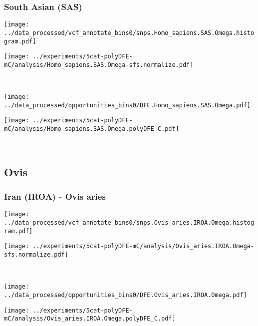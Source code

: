 \subsubsection{South Asian (SAS)}

\begin{minipage}{0.49\linewidth}
    \texttt{[image: ../data\_processed/vcf\_annotate\_bins0/snps.Homo\_sapiens.SAS.Omega.histogram.pdf]}
\end{minipage}
\begin{minipage}{0.49\linewidth}
    \texttt{[image: ../experiments/5cat-polyDFE-mC/analysis/Homo\_sapiens.SAS.Omega-sfs.normalize.pdf]}
\end{minipage}
\\
\begin{minipage}{0.49\linewidth}
    \texttt{[image: ../data\_processed/opportunities\_bins0/DFE.Homo\_sapiens.SAS.Omega.pdf]}
\end{minipage}
\begin{minipage}{0.49\linewidth}
    \texttt{[image: ../experiments/5cat-polyDFE-mC/analysis/Homo\_sapiens.SAS.Omega.polyDFE\_C.pdf]}
\end{minipage}
\\

\subsection{Ovis}

\subsubsection{Iran (IROA) - Ovis aries}

\begin{minipage}{0.49\linewidth}
    \texttt{[image: ../data\_processed/vcf\_annotate\_bins0/snps.Ovis\_aries.IROA.Omega.histogram.pdf]}
\end{minipage}
\begin{minipage}{0.49\linewidth}
    \texttt{[image: ../experiments/5cat-polyDFE-mC/analysis/Ovis\_aries.IROA.Omega-sfs.normalize.pdf]}
\end{minipage}
\\
\begin{minipage}{0.49\linewidth}
    \texttt{[image: ../data\_processed/opportunities\_bins0/DFE.Ovis\_aries.IROA.Omega.pdf]}
\end{minipage}
\begin{minipage}{0.49\linewidth}
    \texttt{[image: ../experiments/5cat-polyDFE-mC/analysis/Ovis\_aries.IROA.Omega.polyDFE\_C.pdf]}
\end{minipage}
\\

